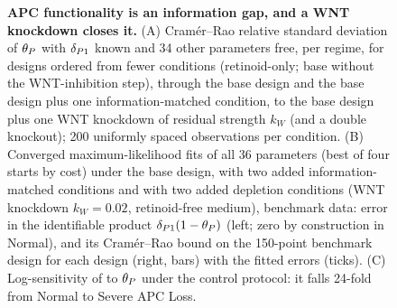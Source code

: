 \begin{figure}[tbp]
\centering
{}
\caption{\textbf{APC functionality is an information gap, and a WNT knockdown
closes it.} (A) Cram\'er--Rao relative standard deviation of $\theta_P$ with $\delta_{P1}$
known and 34 other parameters free, per regime, for designs ordered from fewer
conditions (retinoid-only; base without the WNT-inhibition step), through the
base design and the base design plus one information-matched condition, to the
base design plus one WNT knockdown of residual strength $k_W$ (and a \bcat{}
double knockout); 200 uniformly spaced observations per condition. (B)
Converged maximum-likelihood fits of all 36 parameters (best of four starts by
cost) under the base design, with two added information-matched conditions and
with two added depletion conditions (WNT knockdown $k_W=0.02$, retinoid-free
medium), benchmark data: error in the identifiable product $\delta_{P1}(1-\theta_P)$ (left;
zero by construction in Normal), and its Cram\'er--Rao bound on the 150-point
benchmark design for each design (right, bars) with the fitted errors (ticks). (C) Log-sensitivity of
\bcat{} to $\theta_P$ under the control protocol: it falls 24-fold from Normal to
Severe APC Loss.}
\label{fig:thetaP}
\end{figure}
